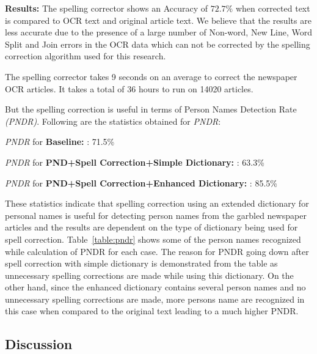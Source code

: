 \documentclass[letterpaper,11pt]{report}
\begin{document}
\noindent \textbf{Results: }
The spelling corrector shows an Accuracy of $72.7 \%$  when corrected text is compared to OCR text and original article text. We believe that the results are less accurate due to the presence of a large number of Non-word, New Line, Word Split and Join errors in the OCR data which can not be corrected by the spelling correction algorithm used for this research.

The spelling corrector takes 9 seconds on an average to correct the newspaper OCR articles. It takes a total of 36 hours to run on 14020 articles.


But the spelling correction is useful in terms of Person Names Detection Rate \textit{(PNDR)}. Following are the statistics obtained for \textit{PNDR}:

\textit{PNDR} for \textbf{Baseline: }: 71.5\% 

\textit{PNDR} for \textbf{PND+Spell Correction+Simple Dictionary: }: 63.3\% 

\textit{PNDR} for \textbf{PND+Spell Correction+Enhanced Dictionary: }: 85.5\% 

These statistics indicate that spelling correction using an extended dictionary for personal names is useful for detecting person names from the garbled newspaper articles and the results are dependent on the type of dictionary being used for spell correction.
 Table~\ref{table:pndr} shows some of the person names recognized while calculation of PNDR for each case. The reason for PNDR going down after spell correction with simple dictionary is demonstrated from the table as unnecessary spelling corrections are made while using this dictionary. On the other hand, since the enhanced dictionary contains several person names and no unnecessary spelling corrections are made, more persons name are recognized in this case when compared to the original text leading to a much higher PNDR. 

\subsection{Discussion}
\label{spell:discussion}
\end{document}
